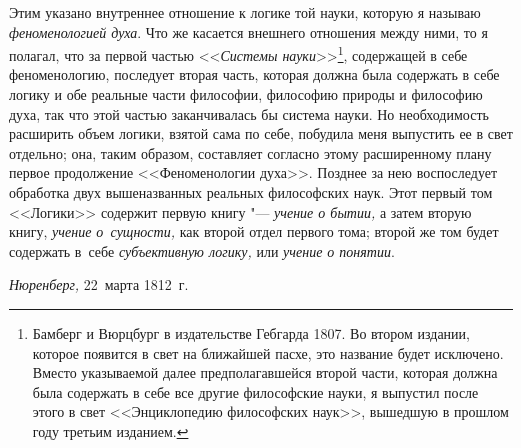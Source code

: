 Этим указано внутреннее отношение к логике той науки, которую я называю
{\em феноменологией духа}. Что же касается внешнего отношения между ними, то я
полагал, что за первой частью <<{\em Системы науки}>>\footnote{Бамберг и
Вюрцбург в издательстве Гебгарда 1807. Во втором издании, которое появится в
свет на ближайшей пасхе, это название будет исключено. Вместо указываемой далее
предполагавшейся второй части, которая должна была содержать в себе все другие
философские науки, я выпустил после этого в свет <<Энциклопедию философских
наук>>, вышедшую в прошлом году третьим изданием.}, содержащей в себе
феноменологию, последует вторая часть, которая должна была содержать в себе
логику и обе реальные части философии, философию природы и философию духа, так
что этой частью заканчивалась бы система науки. Но необходимость расширить
объем логики, взятой сама по себе, побудила меня выпустить ее в свет отдельно;
она, таким образом, составляет согласно этому расширенному плану первое
продолжение <<Феноменологии духа>>. Позднее за нею воспоследует обработка двух
вышеназванных реальных философских наук. Этот первый том <<Логики>> содержит
первую книгу "--- {\em учение о бытии,} а затем вторую книгу,
{\em учение о~сущности,} как второй отдел первого тома; второй же том будет
содержать в~себе {\em субъективную логику,} или {\em учение о понятии}.

{\em Нюренберг,} 22~марта 1812~г.
